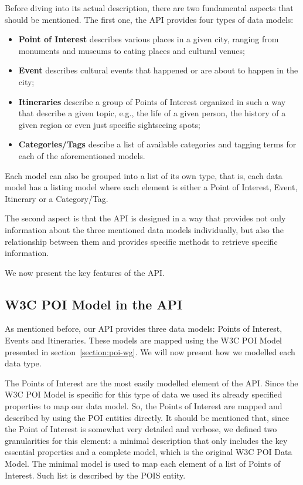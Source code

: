 \documentclass[times]{ettauth}
\begin{document}
Before diving into its actual description, there are two fundamental aspects that should be mentioned. The first one, the API provides four types of data models:
\begin{itemize}
\item \textbf{Point of Interest} describes various places in a given city, ranging from monuments and museums to eating places and cultural venues; 
\item \textbf{Event} describes cultural events that happened or are about to happen in the city;
\item \textbf{Itineraries} describe a group of Points of Interest organized in such a way that describe a given topic, e.g., the life of a given person, the history of a given region or even just specific sightseeing spots;
\item \textbf{Categories/Tags} descibe a list of available categories and tagging terms for each of the aforementioned models.
\end{itemize}

Each model can also be grouped into a list of its own type, that is, each data model has a listing model where each element is either a Point of Interest, Event, Itinerary or a Category/Tag.

The second aspect is that the API is designed in a way that provides not only information about the three mentioned data models individually, but also the relationship between them and provides specific methods to retrieve specific information.

We now present the key features of the API.

\subsection{W3C POI Model in the API}
\label{section:api-design}
As mentioned before, our API provides three data models: Points of Interest, Events and Itineraries. These  models are mapped using the W3C POI Model presented in section~\ref{section:poi-wg}. We will now present how we modelled each data type.

The Points of Interest are the most easily modelled element of the API. Since the W3C POI Model is specific for this type of data we used its already specified properties to map our data model. So, the Points of Interest are mapped and described by using the POI entities directly. It should be mentioned that, since the Point of Interest is somewhat very detailed and verbose, we defined two granularities for this element: a minimal description that only includes the key essential properties and a complete model, which is the original W3C POI Data Model. The minimal model is used to map each element of a list of Points of Interest. Such list is described by the POIS entity.
\end{document}
